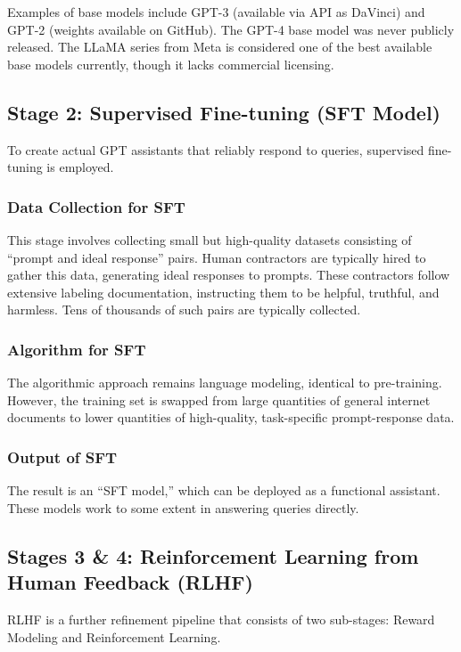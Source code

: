 Examples of base models include GPT-3 (available via API as DaVinci) and GPT-2 (weights available on GitHub). The GPT-4 base model was never publicly released. The LLaMA series from Meta is considered one of the best available base models currently, though it lacks commercial licensing.

\subsection{Stage 2: Supervised Fine-tuning (SFT Model)}

To create actual GPT assistants that reliably respond to queries, supervised fine-tuning is employed.

\subsubsection{Data Collection for SFT}
This stage involves collecting small but high-quality datasets consisting of ``prompt and ideal response'' pairs. Human contractors are typically hired to gather this data, generating ideal responses to prompts. These contractors follow extensive labeling documentation, instructing them to be helpful, truthful, and harmless. Tens of thousands of such pairs are typically collected.

\subsubsection{Algorithm for SFT}
The algorithmic approach remains language modeling, identical to pre-training. However, the training set is swapped from large quantities of general internet documents to lower quantities of high-quality, task-specific prompt-response data.

\subsubsection{Output of SFT}
The result is an ``SFT model,'' which can be deployed as a functional assistant. These models work to some extent in answering queries directly.

\subsection{Stages 3 \& 4: Reinforcement Learning from Human Feedback (RLHF)}

RLHF is a further refinement pipeline that consists of two sub-stages: Reward Modeling and Reinforcement Learning.

